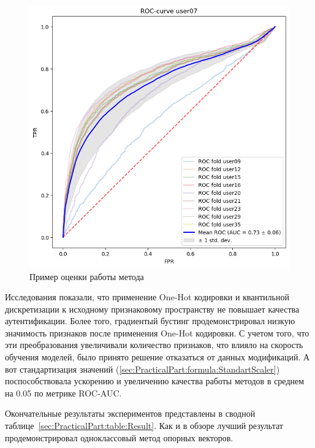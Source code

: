 \documentclass[12pt]{article}
\begin{document}
    \begin{figure}[h!]
        \centering
        \includegraphics[width=0.75\linewidth]{ROC_curve.png}
        \caption{Пример оценки работы метода}
        \label{sec:PracticalPart:fig:ROC_curve}
    \end{figure}

    \par Исследования показали, что применение One-Hot кодировки и квантильной дискретизации к исходному признаковому пространству не повышает качества аутентификации. Более того, градиентый бустинг продемонстрировал низкую значимость признаков после применения One-Hot кодировки. С учетом того, что эти преобразования увеличивали количество признаков, что влияло на скорость обучения моделей, было принято решение отказаться от данных модификаций. А вот стандартизация значений (\ref{sec:PracticalPart:formula:StandartScaler}) поспособствовала ускорению и увеличению качества работы методов в среднем на 0.05 по метрике ROC-AUC.
 
    Окончательные результаты экспериментов представлены в сводной таблице~\ref{sec:PracticalPart:table:Result}. Как и в обзоре лучший результат продемонстрировал одноклассовый метод опорных векторов.
\end{document}
